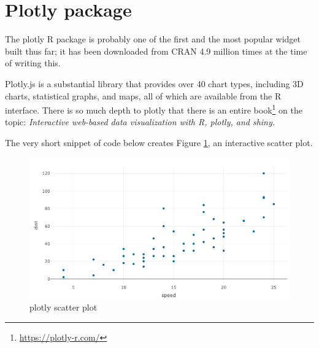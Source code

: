 \documentclass[10pt,]{krantz}
\makeatletter
\newenvironment{Shaded}{\begin{snugshade}}{\end{snugshade}}
\newcommand{\DataTypeTok}[1]{\textcolor[rgb]{0.27,0.27,0.27}{#1}}
\newcommand{\KeywordTok}[1]{\textcolor[rgb]{0.27,0.27,0.27}{\textbf{#1}}}
\newcommand{\NormalTok}[1]{#1}
\newcommand{\OperatorTok}[1]{\textcolor[rgb]{0.43,0.43,0.43}{\textbf{#1}}}
\newcommand{\StringTok}[1]{\textcolor[rgb]{0.5,0.5,0.5}{#1}}
\renewcommand{\href}[2]{#2\footnote{\url{#1}}}
\newenvironment{kframe}{%
\medskip{}
\setlength{\fboxsep}{.8em}
 \def\at@end@of@kframe{}%
 \ifinner\ifhmode%
  \def\at@end@of@kframe{\end{minipage}}%
  \begin{minipage}{\columnwidth}%
 \fi\fi%
 \def\FrameCommand##1{\hskip\@totalleftmargin \hskip-\fboxsep
 \colorbox{shadecolor}{##1}\hskip-\fboxsep
     \hskip-\linewidth \hskip-\@totalleftmargin \hskip\columnwidth}%
 \MakeFramed {\advance\hsize-\width
   \@totalleftmargin\z@ \linewidth\hsize
   \@setminipage}}%
 {\par\unskip\endMakeFramed%
 \at@end@of@kframe}
\renewenvironment{Shaded}{\begin{kframe}}{\end{kframe}}
\makeatother
\begin{document}
\hypertarget{widgets-plotly}{%
\section{Plotly package}\label{widgets-plotly}}

The plotly \citep{R-plotly} R package is probably one of the first and the most popular widget built thus far; it has been downloaded from CRAN 4.9 million times at the time of writing this.

Plotly.js is a substantial library that provides over 40 chart types, including 3D charts, statistical graphs, and maps, all of which are available from the R interface. There is so much depth to plotly that there is an entire \href{https://plotly-r.com/}{book} on the topic: \emph{Interactive web-based data visualization with R, plotly, and shiny.}

The very short snippet of code below creates Figure \ref{fig:plotly-scatter-diagram}, an interactive scatter plot.

\begin{Shaded}
\end{Shaded}

\begin{figure}[H]

{\centering \includegraphics[width=1\linewidth]{images/03-plotly-scatter} 

}

\caption{plotly scatter plot}\label{fig:plotly-scatter-diagram}
\end{figure}
\end{document}

